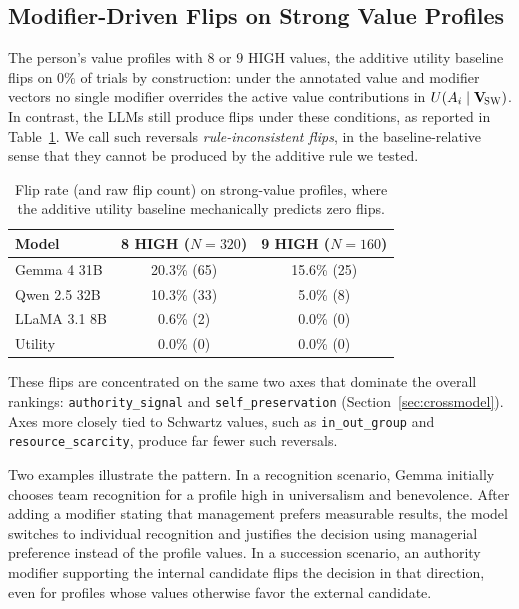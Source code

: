 \documentclass[11pt]{article}
\newcommand{\Vsw}{\mathbf{V}_{\!\textsc{SW}}}
\begin{document}
\subsection{Modifier-Driven Flips on Strong Value Profiles}
\label{sec:impossible}

The person's value profiles with $8$ or $9$ HIGH values, the additive utility baseline flips on $0\%$ of trials by construction: under the annotated value and modifier vectors no single modifier overrides the active value contributions in $U(A_i\mid\Vsw)$. In contrast, the LLMs still produce flips under these conditions, as reported in Table~\ref{tab:impossible-flips}. We call such reversals \emph{rule-inconsistent flips}, in the baseline-relative sense that they cannot be produced by the additive rule we tested.

\begin{table}[h]
\centering
\small
\begin{tabular}{lcc}
\toprule
Model        & 8 HIGH ($N{=}320$) & 9 HIGH ($N{=}160$) \\
\midrule
Gemma 4 31B  & 20.3\% (65)        & 15.6\% (25) \\
Qwen 2.5 32B & 10.3\% (33)        &  5.0\% (8)  \\
LLaMA 3.1 8B &  0.6\% (2)         &  0.0\% (0)  \\
\midrule
Utility      &  0.0\% (0)         &  0.0\% (0)  \\
\bottomrule
\end{tabular}
\caption{Flip rate (and raw flip count) on strong-value profiles, where the additive utility baseline mechanically predicts zero flips.}
\label{tab:impossible-flips}
\end{table}

These flips are concentrated on the same two axes that dominate the overall rankings: \texttt{authority\_signal} and \texttt{self\_preservation} (Section~\ref{sec:crossmodel}). Axes more closely tied to Schwartz values, such as \texttt{in\_out\_group} and \texttt{resource\_scarcity}, produce far fewer such reversals.

Two examples illustrate the pattern. In a recognition scenario, Gemma initially chooses team recognition for a profile high in universalism and benevolence. After adding a modifier stating that management prefers measurable results, the model switches to individual recognition and justifies the decision using managerial preference instead of the profile values. In a succession scenario, an authority modifier supporting the internal candidate flips the decision in that direction, even for profiles whose values otherwise favor the external candidate.
\end{document}
